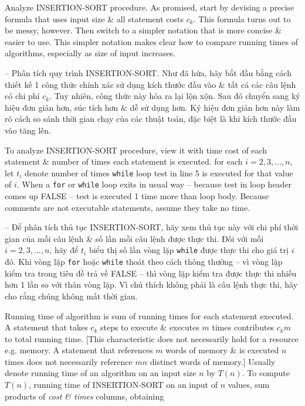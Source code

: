 \documentclass{article}
\begin{document}
\begin{itemize}
\begin{itemize}
\begin{itemize}
            Analyze INSERTION-SORT procedure. As promised, start by devising a precise formula that uses input size \& all statement costs $c_k$. This formula turns out to be messy, however. Then switch to a simpler notation that is more concise \& easier to use. This simpler notation makes clear how to compare running times of algorithms, especially as size of input increases.
            
            -- Phân tích quy trình INSERTION-SORT. Như đã hứa, hãy bắt đầu bằng cách thiết kế 1 công thức chính xác sử dụng kích thước đầu vào \& tất cả các câu lệnh có chi phí $c_k$. Tuy nhiên, công thức này hóa ra lại lộn xộn. Sau đó chuyển sang ký hiệu đơn giản hơn, súc tích hơn \& dễ sử dụng hơn. Ký hiệu đơn giản hơn này làm rõ cách so sánh thời gian chạy của các thuật toán, đặc biệt là khi kích thước đầu vào tăng lên.
            
            To analyze INSERTION-SORT procedure, view it with time cost of each statement \& number of times each statement is executed. for each $i = 2,3,\ldots,n$, let $t_i$ denote number of times {\tt while} loop test in line 5 is executed for that value of $i$. When a {\tt for} or {\tt while} loop exits in usual way -- because test in loop header comes up FALSE -- test is executed 1 time more than loop body. Because comments are not executable statements, assume they take no time.
            
            -- Để phân tích thủ tục INSERTION-SORT, hãy xem thủ tục này với chi phí thời gian của mỗi câu lệnh \& số lần mỗi câu lệnh được thực thi. Đối với mỗi $i = 2,3,\ldots,n$, hãy để $t_i$ biểu thị số lần vòng lặp {\tt while} được thực thi cho giá trị $i$ đó. Khi vòng lặp {\tt for} hoặc {\tt while} thoát theo cách thông thường -- vì vòng lặp kiểm tra trong tiêu đề trả về FALSE -- thì vòng lặp kiểm tra được thực thi nhiều hơn 1 lần so với thân vòng lặp. Vì chú thích không phải là câu lệnh thực thi, hãy cho rằng chúng không mất thời gian.
            
            Running time of algorithm is sum of running times for each statement executed. A statement that takes $c_k$ steps to execute \& executes $m$ times contributes $c_km$ to total running time. [This characteristic does not necessarily hold for a resource e.g. memory. A statement that references $m$ words of memory \& is executed $n$ times does not necessarily reference $mn$ distinct words of memory.] Usually denote running time of an algorithm on an input size $n$ by $T(n)$. To compute $T(n)$, running time of INSERTION-SORT on an input of $n$ values, sum products of {\it cost \& times} columns, obtaining
            

\end{itemize}
\end{itemize}
\end{itemize}
\end{document}
